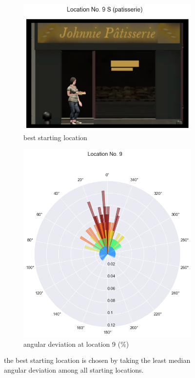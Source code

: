 \begin{figure}[!htb]
	\centering
	\begin{subfigure}[b]{0.48\linewidth}
		\includegraphics[width=\linewidth]{figures/best_loc_angular_error_withHA_23.png}
		\caption{best starting location}
		\label{fig:best_angular}
	\end{subfigure}
	\begin{subfigure}[b]{0.48\linewidth}
		\includegraphics[width=\linewidth]{figures/deviation_degrees_loc_nr_9_23.png}
		\caption{angular deviation at location 9 (\%)}
		\label{fig:best_angular_dist_9}
	\end{subfigure}
	
	\caption[Best starting location based on angular deviation]{the best starting location is chosen by taking the least median angular deviation among all starting locations.}
\end{figure}
\label{fig:best_location}

